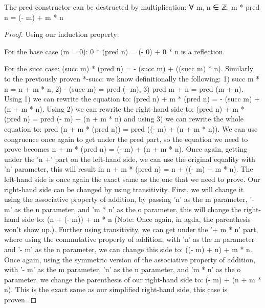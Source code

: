 \begin{theorem}
  The pred constructor can be destructed by multiplication: ∀ m, n ∈ ℤ: m * pred n = (- m) + m * n
\end{theorem}

\begin{proof}
  Using our induction property:

  For the base case (m = 0): 0 * (pred n) = (- 0) + 0 * n is a reflection.

  For the succ case: (succ m) * (pred n) = - (succ m) + ((succ m) * n). Similarly to the previously proven *-succ: we know definitionally the following: 1) succ m * n = n + m * n, 2) - (succ m) = pred (- m), 3) pred m + n = pred (m + n). Using 1) we can rewrite the equation to: (pred n) + m * (pred n) = - (succ m) + (n + m * n). Using 2) we can rewrite the right-hand side to: (pred n) + m * (pred n) = pred (- m) + (n + m * n) and using 3) we can rewrite the whole equation to: pred (n + m * (pred n)) = pred ((- m) + (n + m * n)). We can use congruence once again to get under the pred part, so the equation we need to prove becomes n + m * (pred n) = (- m) + (n + m * n). Once again, getting under the 'n +' part on the left-hand side, we can use the original equality with 'n' parameter, this will result in n + m * (pred n) = n + ((- m) + m * n). The left-hand side is once again the exact same as the one that we need to prove. Our right-hand side can be changed by using transitivity. First, we will change it using the associative property of addition, by passing 'n' as the m parameter, '- m' as the n parameter, and 'm * n' as the o parameter, this will change the right-hand side to: (n + (- m)) + m * n (Note: Once again, in agda, the parenthesis won't show up.). Further using transitivity, we can get under the '+ m * n' part, where using the commutative property of addition, with 'n' as the m parameter and '- m' as the n parameter, we can change this side to: ((- m) + n) + m * n. Once again, using the symmetric version of the associative property of addition, with '- m' as the m parameter, 'n' as the n parameter, and 'm * n' as the o parameter, we change the parenthesis of our right-hand side to: (- m) + (n + m * n). This is the exact same as our simplified right-hand side, this case is proven.


\end{proof}
